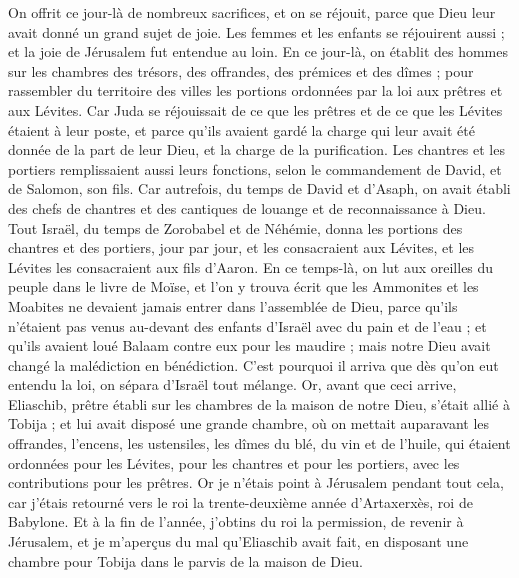 \begin{multicols}{2}
On offrit ce jour-là de nombreux sacrifices, et on se réjouit, parce que Dieu leur avait donné un grand sujet de joie. Les femmes et les enfants se réjouirent aussi ; et la joie de Jérusalem fut entendue au loin.
En ce jour-là, on établit des hommes sur les chambres des trésors, des offrandes, des prémices et des dîmes ; pour rassembler du territoire des villes les portions ordonnées par la loi aux prêtres et aux Lévites. Car Juda se réjouissait de ce que les prêtres et de ce que les Lévites étaient à leur poste,
et parce qu'ils avaient gardé la charge qui leur avait été donnée de la part de leur Dieu, et la charge de la purification. Les chantres et les portiers remplissaient aussi leurs fonctions, selon le commandement de David, et de Salomon, son fils.
Car autrefois, du temps de David et d'Asaph, on avait établi des chefs de chantres et des cantiques de louange et de reconnaissance à Dieu.
Tout Israël, du temps de Zorobabel et de Néhémie, donna les portions des chantres et des portiers, jour par jour, et les consacraient aux Lévites, et les Lévites les consacraient aux fils d'Aaron.
\VerseOne{}En ce temps-là, on lut aux oreilles du peuple dans le livre de Moïse, et l'on y trouva écrit que les Ammonites et les Moabites ne devaient jamais entrer dans l'assemblée de Dieu,
parce qu'ils n'étaient pas venus au-devant des enfants d'Israël avec du pain et de l'eau ; et qu'ils avaient loué Balaam contre eux pour les maudire ; mais notre Dieu avait changé la malédiction en bénédiction.
 C'est pourquoi il arriva que dès qu'on eut entendu la loi, on sépara d'Israël tout mélange.
Or, avant que ceci arrive, Eliaschib, prêtre établi sur les chambres de la maison de notre Dieu, s'était allié à Tobija ;
et lui avait disposé une grande chambre, où on mettait auparavant les offrandes, l'encens, les ustensiles, les dîmes du blé, du vin et de l'huile, qui étaient ordonnées pour les Lévites, pour les chantres et pour les portiers, avec les contributions pour les prêtres.
Or je n'étais point à Jérusalem pendant tout cela, car j'étais retourné vers le roi la trente-deuxième année d'Artaxerxès, roi de Babylone. Et à la fin de l'année, j'obtins du roi la permission,
de revenir à Jérusalem, et je m'aperçus du mal qu'Eliaschib avait fait, en disposant une chambre pour Tobija dans le parvis de la maison de Dieu.

\end{multicols}
